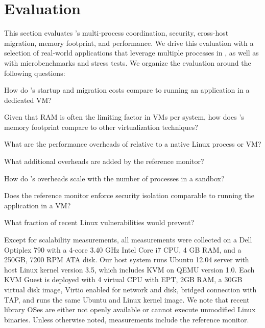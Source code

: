 
\section{Evaluation}
\label{sec:graphene:eval}



This section evaluates \sysname{}'s multi-process coordination, security, cross-host migration, memory footprint, and performance.
We drive this evaluation with a selection of real-world applications that leverage multiple processes in \sysname{},
as well as with microbenchmarks and stress tests.
We organize the evaluation around the following questions:
\begin{compactenum}
\item How do \sysname{}'s startup and migration costs compare to running an application in a dedicated VM?
\item Given that RAM is often the limiting factor in VMs per system, how does \sysname{}'s memory footprint compare to other virtualization techniques?
\item What are the performance overheads of \sysname{} relative to a native Linux process or VM?
\item What additional overheads are added by the reference monitor?
\item How do \sysname{}'s overheads scale with the number of processes in a sandbox?
\item Does the \sysname{} reference monitor enforce security isolation comparable to running the application in a VM?  
\item What fraction of recent Linux vulnerabilities would \sysname{} prevent?
\end{compactenum}


Except for scalability measurements, 
all measurements were collected on a 
Dell Optiplex 790 with 
a 4-core 3.40 GHz Intel Core i7 CPU,
4 GB RAM, and a 250GB, 7200 RPM ATA disk.
Our host system runs Ubuntu 12.04 server with host Linux kernel version 3.5, 
which includes KVM on 
QEMU version 1.0.
Each KVM Guest is deployed with 4 virtual CPU with EPT, 2GB RAM, a 30GB virtual disk image, Virtio enabled for network and disk, bridged connection with TAP, and runs the same Ubuntu and Linux kernel image.
We note that recent library OSes are either not openly available
or cannot execute unmodified Linux binaries.
Unless otherwise noted, \sysname{} measurements include the reference monitor.


